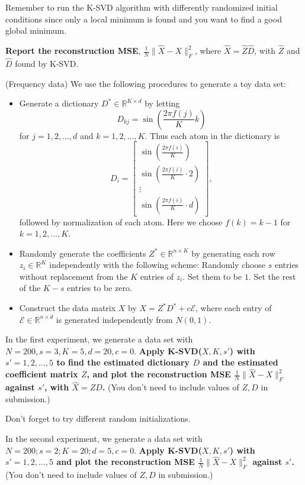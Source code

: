 \begin{Parts}
Remember to run the K-SVD algorithm with differently randomized
initial conditions since only a local minimum is found and you want to
find a good global minimum. 

{\bf Report the reconstruction MSE}, $\frac{1}{N}\|\hat{X} - X\|_F^2$, where $\hat{X} = \hat{Z}\hat{D}$, with $\hat{Z}$ and $\hat{D}$ found by K-SVD. 

\Part (Frequency data)  We use the following procedures to generate a toy data set:
\begin{itemize}
  \item Generate a dictionary $D^*\in\mathbb R^{K\times d}$ by letting 
  $$D_{kj}=\sin (\frac{2\pi f(j)}{K}k)$$ 
  for $j=1,2,\dots,d$ and $k=1,2,\dots,K$. Thus each atom in the dictionary is 
  \begin{equation*}
  D_i = \begin{bmatrix}
  \sin (\frac{2\pi f(i)}{K})\\
  \sin (\frac{2\pi f(i)}{K}\cdot 2)\\
  \vdots\\
  \sin (\frac{2\pi f(i)}{K}\cdot d)
  \end{bmatrix},
  \end{equation*}
  followed by normalization of each atom. Here we choose $f(k) = k-1$ for $k=1,2,\dots,K$.
  \item Randomly generate the coefficients $Z^*\in\mathbb R^{n\times
      K}$ by generating each row $z_i\in \mathbb R^K$ independently
    with the following scheme: Randomly choose $s$ entries without
    replacement from the $K$ entries of $z_i$. Set them to be $1$. Set
    the rest of the $K-s$ entries to be zero. 
  \item Construct the data matrix $X$ by $X=Z^*D^* + c\mathcal E$, where each entry of $\mathcal E\in\mathbb R^{n\times d}$ is generated independently from $N(0,1)$.
\end{itemize}

In the first experiment, we generate a data set with $N=200, s=3, K=5,
d=20, c=0$. {\bf Apply K-SVD($X, K, s'$) with $s'=1,2,\dots,5$ to find the
estimated dictionary $D$ and the estimated coefficient matrix $Z$, and
plot the reconstruction MSE $\frac{1}{N} \|\hat X - X\|_F^2$ against
$s'$, with $\hat{X}=ZD$.} (You don't need to include values of $Z,D$ in
submission.) 

Don't forget to try different random initializations. 



\Part In the second experiment, we generate a data set with $N = 200;
s = 2; K = 20; d = 5, c=0$. {\bf Apply K-SVD($X, K, s'$) with $s'=1,2,\dots,5$ and plot the reconstruction MSE $\frac 1 N \|\hat X - X\|_F^2$ against $s'$. }(You don't need to include values of $Z,D$ in submission.)




\end{Parts}
